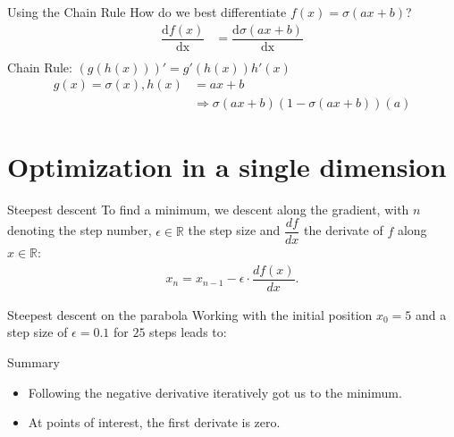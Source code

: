 \documentclass{beamer}
\begin{document}
    \begin{frame}{Using the Chain Rule}
      How do we best differentiate $f(x) = \sigma( ax + b)$?
      \begin{align}
        \dfrac{\text{d}f(x)}{\text{dx}} &= \dfrac{\text{d}\sigma( ax + b)}{\text{dx}}  \\
      \end{align}
      Chain Rule:    $(g(h(x)))' = g'(h(x))h'(x) $
      \begin{align}
        g(x) = \sigma(x), h(x) &= ax+b \\
                               &\Rightarrow \sigma(ax+b)(1 - \sigma(ax+b))(a) 
      \end{align}
    \end{frame}

    \section{Optimization in a single dimension}
    \begin{frame}{Steepest descent}
      To find a minimum, we descent along the gradient, with $n$ denoting the step number,
      $\epsilon \in \mathbb{R}$ the step size and $\dfrac{d f}{dx}$ the derivate of $f$ along 
      $x \in \mathbb{R}$:
      \begin{align}
        x_n = x_{n-1} - \epsilon \cdot \dfrac{d f(x)}{dx}.
      \end{align}
    \end{frame}


    \begin{frame}{Steepest descent on the parabola}
      Working with the initial position $x_0 = 5$ and a step size of $\epsilon = 0.1$ for $25$ steps leads to: 
      \begin{figure}
        
        
      \end{figure}
    \end{frame}

    \begin{frame}{Summary}
      \begin{itemize}
        \item Following the negative derivative iteratively got us to the minimum.
        \item At points of interest, the first derivate is zero. 
      \end{itemize}
    \end{frame}
\end{document}
